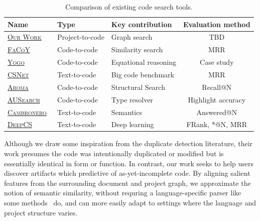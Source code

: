 \documentclass[11pt]{article}
\begin{document}
{ %
\renewcommand{\arraystretch}{1.5}
\begin{table}[H]
  \small
  \begin{tabular}{lllc}
    Name & Type & Key contribution & Evaluation method \\
    \hline
    \href{https://github.com/breandan/gym-fs}{\textsc{Our Work}} & Project-to-code & Graph search & TBD \\
    \href{https://core.ac.uk/download/pdf/162022846.pdf#page=7}{\textsc{FaCoY}}~\citep{kim2018facoy} & Code-to-code & Similarity search & MRR \\
    \href{http://www.jameskoppel.com/files/papers/yogo-preprint.pdf#page=11}{\textsc{Yogo}}~\cite{premtoon2020semantic}     & Code-to-code & Equational reasoning & Case study \\
    \href{https://arxiv.org/pdf/1909.09436.pdf#page=5}{\textsc{CSNet}}~\citep{husain2019codesearchnet}     & Text-to-code & Big code benchmark & MRR \\
    \href{https://arxiv.org/pdf/1812.01158.pdf#section.5}{\textsc{Aroma}}~\citep{luan2019aroma}     & Code-to-code & Structural Search& Recall@N \\
    \href{https://raw.githubusercontent.com/mhilmiasyrofi/AUSearch/master/SANER_2020_AUSearch.pdf}{\textsc{AUSearch}}~\citep{asyrofi2020ausearch}     & Code-to-code & Type resolver & Highlight accuracy \\

    \href{https://arxiv.org/pdf/1905.03813.pdf#section.4}{\textsc{Cambronero}}~\citep{cambronero2019deep}     & Text-to-code & Semantics & Answered@N \\
    \href{https://guxd.github.io/papers/deepcs.pdf#section.5}{\textsc{DeepCS}}~\citep{gu2018deep}     & Text-to-code & Deep learning & FRank, *@N, MRR \\
  \end{tabular}
  \caption{\label{tab:ad_comparison} Comparison of existing code search tools.}
\end{table}
}

Although we draw some inspiration from the duplicate detection literature, their work presumes the code was intentionally duplicated or modified but is essentially identical in form or function. In contrast, our work seeks to help users discover artifacts which predictive of as-yet-incomplete code. By aligning salient features from the surrounding document and project graph, we approximate the notion of semantic similarity, without requring a language-specific parser like some methods~\citep{cambronero2019deep} do, and can more easily adapt to settings where the language and project structure varies.
\end{document}
